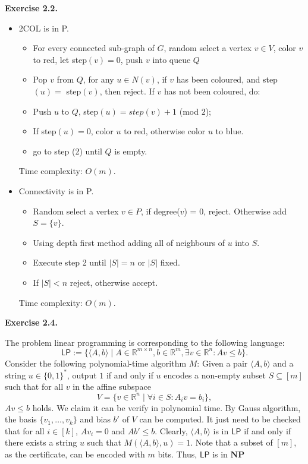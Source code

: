 \documentclass[a4paper]{article}
\newenvironment{exercise}[1]{
	\par
	\noindent\textbf{Exercise #1.}\quad
}{
	\par
	\bigskip
}
\begin{document}
\begin{exercise}{2.2}
\begin{itemize}
\item 2COL is in P. %
\begin{itemize}
\item For every connected sub-graph of $G$, random select a vertex $v\in V$, color $v$ to red, let step$(v) = 0$, push $v$ into queue $Q$\;
\item \quad Pop $v$ from $Q$, for any $u \in N(v)$, if $v$ has been coloured, and step$(u)=$ step$(v)$, then reject. If $v$ has not been coloured, do:
\item \quad \quad Push $u$ to $Q$, step$(u)=step(v) + 1$ (mod $2$);
\item \quad \quad If step$(u)=0$, color $u$ to red, otherwise color $u$ to blue.
\item \quad go to step (2) until $Q$ is empty.
\end{itemize}
Time complexity: $O(m)$.
\item Connectivity is in P.
\begin{itemize}
\item Random select a vertex $v\in P$, if degree($v$) = 0, reject. Otherwise add $S = \{v\}$.
\item Using depth first method adding all of neighbours of $u$ into $S$.
\item Execute step 2 until $|S| = n$ or $|S|$ fixed.
\item If $|S|< n$ reject, otherwise accept.
\end{itemize}
Time complexity: $O(m)$.
\end{itemize}

\end{exercise}


\begin{exercise}{2.4}
	The problem linear programming is corresponding to the following language:
	\[
		\mathsf{LP} := \{\langle A,b \rangle \mid A \in \mathbb{R}^{m\times n}, b \in \mathbb{R}^m, \exists v \in \mathbb{R}^n: Av \leq b\}.
	\]
	Consider the following polynomial-time algorithm $M$: Given a pair $\langle A,b \rangle$ and a string $u \in \{0,1\}^*$, output $1$ if and only if $u$ encodes a non-empty subset $S \subseteq [m]$ such that for all $v$ in the affine subspace
	\[
		V = \{v \in \mathbb{R}^n \mid \forall i \in S: A_i v = b_i\},
	\]
	$Av \leq b$ holds. We claim it can be verify in polynomial time. By Gauss algorithm, the basis $\{v_1,\ldots,v_k\}$ and bias $b'$ of $V$ can be computed. It just need to be checked that for all $i\in [k]$, $A v_i = 0$ and $Ab' \leq b$. Clearly, $\langle A,b \rangle$ is in $\mathsf{LP}$ if and only if there exists a string $u$ such that $M(\langle A,b \rangle, u) = 1$. Note that a subset of $[m]$, as the certificate, can be encoded with $m$ bits. Thus, $\mathsf{LP}$ is in $\mathbf{NP}$
\end{exercise}
\end{document}

